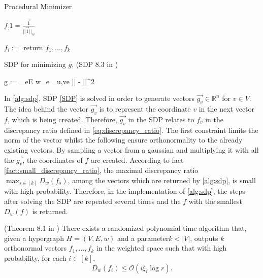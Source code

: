  
\begin{algorithm}[htpb]
	\caption{Procedural Minimizer \label{alg:procedural_minimizer}} 
	\begin{algorithmic}
		\State $f_:1= \frac{\vec{1}}{||\vec{1}||_w}$
		
		\State $f_i := $
		\EndFor
		\State return $f_1, \ldots , f_k$
		\EndFunction 
	\end{algorithmic}
\end{algorithm}	

\begin{sdp}{SDP for minimizing $g$, (SDP 8.3 in \cite{ChanLTZ16}) \label{SDP}} %
	\begin{mini*}
		{g}{ := \sum_{e\in E} w_e \max_{u,v\in e} || - ||^2}{}{}
	\end{mini*}
\end{sdp}


In \cref{alg:sdp}, SDP \ref{SDP} is solved in order to generate vectors $\vec{g_v} \in \mathbb{R}^n $ for $v \in V$. The idea behind the vector $\vec{g_v}$ is to represent the coordinate $v$ in the next vector $f$, which is being created. Therefore, $\vec{g_v} $ in the SDP relates to $f_v $ in the discrepancy ratio defined in \cref{eq:discrepancy_ratio}. The first constraint limits the norm of the vector whilst the following ensure orthonormality to the already existing vectors. By sampling a vector from a gaussian and multiplying it with all the $\vec{g_v}$, the coordinates of $f$ are created. According to fact \ref{fact:small_discrepancy_ratio}, the maximal discrepancy ratio $ \max_{s \in [k]} D_w(f_s)$, among the vectors which are returned by \cref{alg:sdp}, is small with high probability. Therefore, in the implementation of \cref{alg:sdp}, the steps after solving the SDP are repeated several times and the $f$ with the smallest $D_w(f)$ is returned.

\begin{fact}{(Theorem 8.1 in \cite{ChanLTZ16}) \label{fact:small_discrepancy_ratio}}
There exists a randomized polynomial time algorithm that, given a hypergraph $H = (V,E,w)$ and a parameter$ k < |V |$, outputs $k$ orthonormal vectors $f_1, \ldots , f_k$ in the weighted space such that with high probability, for each $i  \in [k],$
\begin{equation}
	D_w(f_i) \le \mathcal{O} (i \xi_i \log r  ) .
\end{equation}	
\end{fact}


